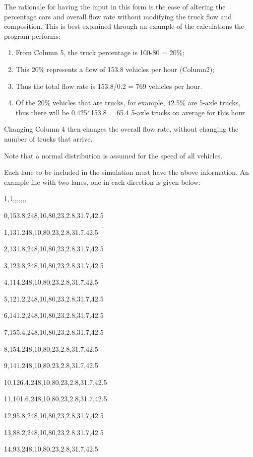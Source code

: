 \documentclass[
]{article}
\begin{document}
The rationale for having the input in this form is the ease of altering
the percentage cars and overall flow rate without modifying the truck
flow and composition. This is best explained through an example of the
calculations the program performs:

\begin{enumerate}
\def\labelenumi{\arabic{enumi}.}
\item
  From Column 5, the truck percentage is 100-80 = 20\%;
\item
  This 20\% represents a flow of 153.8 vehicles per hour (Column2);
\item
  Thus the total flow rate is 153.8/0.2 = 769 vehicles per hour.
\item
  Of the 20\% vehicles that are trucks, for example, 42.5\% are 5-axle
  trucks, thus there will be 0.425*153.8 = 65.4 5-axle trucks on average
  for this hour.
\end{enumerate}

Changing Column 4 then changes the overall flow rate, without changing
the number of trucks that arrive.

Note that a normal distribution is assumed for the speed of all
vehicles.

Each lane to be included in the simulation must have the above
information. An example file with two lanes, one in each direction is
given below:

1,1,,,,,,,

0,153.8,248,10,80,23,2.8,31.7,42.5

1,131,248,10,80,23,2.8,31.7,42.5

2,131.8,248,10,80,23,2.8,31.7,42.5

3,123.8,248,10,80,23,2.8,31.7,42.5

4,114,248,10,80,23,2.8,31.7,42.5

5,121.2,248,10,80,23,2.8,31.7,42.5

6,141.2,248,10,80,23,2.8,31.7,42.5

7,155.4,248,10,80,23,2.8,31.7,42.5

8,154,248,10,80,23,2.8,31.7,42.5

9,141,248,10,80,23,2.8,31.7,42.5

10,126.4,248,10,80,23,2.8,31.7,42.5

11,101.6,248,10,80,23,2.8,31.7,42.5

12,95.8,248,10,80,23,2.8,31.7,42.5

13,88.2,248,10,80,23,2.8,31.7,42.5

14,93,248,10,80,23,2.8,31.7,42.5
\end{document}
